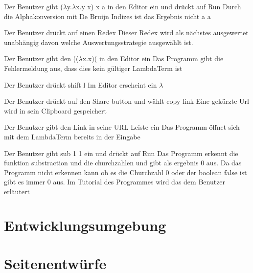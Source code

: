 \documentclass[parskip=full,11pt,twoside]{scrartcl}
\begin{document}
{ Der Benutzer gibt ($\lambda$y.$\lambda$x.y x) x a in den Editor ein und drückt auf Run}
{ Durch die Alphakonversion mit De Bruijn Indizes ist das Ergebnis nicht a  a  }

 { Der Benutzer drückt auf einen Redex}
{ Dieser Redex wird als nächstes ausgewertet unabhängig davon welche Auswertungsstrategie ausgewählt ist. }

{ Der Benutzer gibt den (($\lambda$x.x)( in den Editor ein }
{ Das Programm gibt die Fehlermeldung aus, dass dies kein gültiger LambdaTerm ist }

{ Der Benutzer drückt shift l }
{Im Editor erscheint ein $\lambda$}

{ Der Benutzer drückt auf den Share button und wählt copy-link}
{ Eine gekürzte Url wird in sein Clipboard gespeichert }

{Der Benutzer gibt den Link in seine URL Leiste ein }
{ Das Programm öffnet sich mit dem LambdaTerm bereits in der Eingabe }

{ Der Benutzer gibt sub 1 1 ein und drückt auf Run }
{ Das Programm erkennt die funktion substraction und die churchzahlen und gibt als ergebnis 0 aus. Da das Programm nicht erkennen kann ob es die Churchzahl 0 oder der boolean false ist gibt es immer 0 aus. Im Tutorial des Programmes wird das dem Benutzer erläutert }






\section{Entwicklungsumgebung}

\pagebreak
\appendix

\section{Seitenentwürfe}
\end{document}
